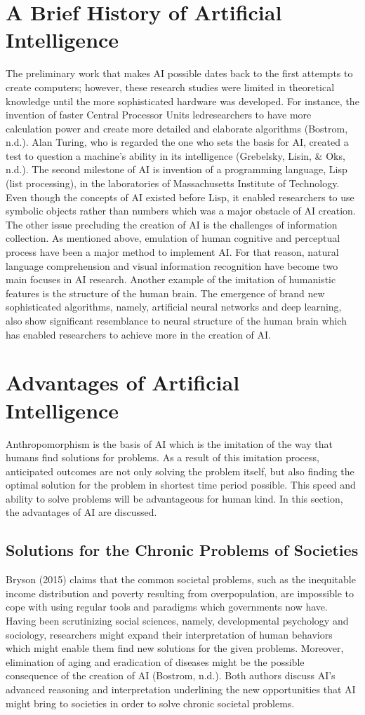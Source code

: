\documentclass[man]{apa6}
\begin{document}
\section{A Brief History of Artificial Intelligence}
The preliminary work that makes AI possible dates back to the first attempts to create computers; however, these research studies were limited in theoretical knowledge until the more
sophisticated hardware was developed. For instance, the invention of faster Central Processor Units ledresearchers to have more calculation power and create more detailed and elaborate algorithms (Bostrom, n.d.). Alan Turing, who is regarded the one who sets the basis for AI, created a test to question a machine's ability in its intelligence (Grebelsky, Lisin, \& Oks, n.d.). The second milestone of AI is invention of a programming language, Lisp (list processing), in the laboratories of Massachusetts Institute of Technology. Even though the concepts of AI existed before Lisp, it enabled researchers to use symbolic objects rather than numbers which was a major obstacle of AI creation. The other issue precluding the creation of AI is the challenges of information collection. As mentioned above, emulation of human cognitive and perceptual process have been a major method to implement AI. For that reason, natural language comprehension and visual information recognition have become two main focuses in AI research. Another example of the imitation of humanistic features is the structure of the human brain. The emergence of brand new sophisticated algorithms, namely, artificial neural networks and deep learning, also show significant resemblance to neural structure of the human brain which has
enabled researchers to achieve more in the creation of AI. 
\section{Advantages of Artificial Intelligence}
Anthropomorphism is the basis of AI which is the imitation of the way that humans find solutions for problems. As a result of this imitation process, anticipated outcomes are not only solving the problem itself, but also finding the optimal solution for the problem in shortest time period possible. This speed and ability to solve problems will be advantageous for human kind. In this section, the advantages of AI are discussed. 
\subsection{Solutions for the Chronic Problems of Societies}
Bryson (2015) claims that the common societal problems, such as the inequitable income distribution and poverty resulting from overpopulation, are impossible to cope with using regular tools and paradigms which governments now have. Having been scrutinizing social sciences, namely, developmental psychology and sociology, researchers might expand their interpretation of human behaviors which might enable them find new solutions for the given problems. Moreover, elimination of aging and eradication of diseases might be the possible consequence of the creation of AI (Bostrom, n.d.). Both authors discuss AI's advanced reasoning and interpretation underlining the new opportunities that AI might bring to societies in order to solve chronic societal problems.
\end{document}
